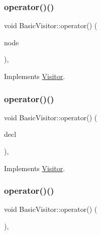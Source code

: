 \subsubsection{\texorpdfstring{operator()()}{operator()()}\hspace{0.1cm}{\footnotesize\ttfamily [44/59]}}
{\footnotesize\ttfamily void Basic\+Visitor\+::operator() (\begin{DoxyParamCaption}\item[{const \hyperlink{struct_function_body}{Function\+Body} \&}]{node }\end{DoxyParamCaption})\hspace{0.3cm}{\ttfamily [inline]}, {\ttfamily [virtual]}}



Implements \hyperlink{struct_visitor_a72bb7e5f0b3bd7ebc8e30f5903a5c5f2}{Visitor}.

\mbox{\label{struct_basic_visitor_a89040003d494fc8559a9d0b19d0e657d}} 
\subsubsection{\texorpdfstring{operator()()}{operator()()}\hspace{0.1cm}{\footnotesize\ttfamily [45/59]}}
{\footnotesize\ttfamily void Basic\+Visitor\+::operator() (\begin{DoxyParamCaption}\item[{const \hyperlink{struct_variable_declaration}{Variable\+Declaration} \&}]{decl }\end{DoxyParamCaption})\hspace{0.3cm}{\ttfamily [inline]}, {\ttfamily [virtual]}}



Implements \hyperlink{struct_visitor_a31c2d34895501d90193ec523c8acde05}{Visitor}.

\mbox{\label{struct_basic_visitor_a365b77b2a395a7525224bcb5d422115a}} 
\subsubsection{\texorpdfstring{operator()()}{operator()()}\hspace{0.1cm}{\footnotesize\ttfamily [46/59]}}
{\footnotesize\ttfamily void Basic\+Visitor\+::operator() (\begin{DoxyParamCaption}\item[{const \hyperlink{struct_elision}{Elision} \&}]{ }\end{DoxyParamCaption})\hspace{0.3cm}{\ttfamily [inline]}, {\ttfamily [virtual]}}



